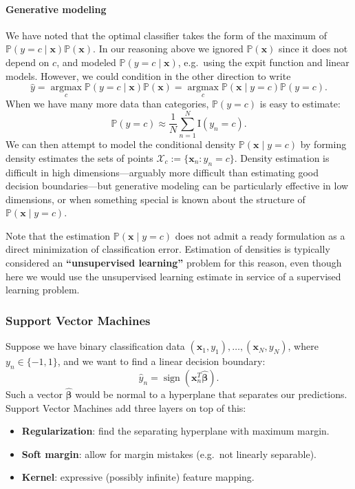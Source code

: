 \paragraph{Generative modeling}
We have noted that the optimal classifier takes the form of the maximum of $\mathbb{P}(y = c \mid \mathbf{x})\mathbb{P}(\mathbf{x})$. In our reasoning above we ignored $\mathbb{P}(\mathbf{x})$ since it does not depend on $c$, and modeled $\mathbb{P}(y = c \mid \mathbf{x})$, e.g.\ using the expit function and linear models.
However, we could condition in the other direction to write
\begin{equation*}
\hat{y} = \operatorname*{argmax}_{c} \mathbb{P}(y = c \mid \mathbf{x})\mathbb{P}(\mathbf{x}) = \operatorname*{argmax}_{c} \mathbb{P}(\mathbf{x} \mid y = c)\mathbb{P}(y = c).
\end{equation*}
When we have many more data than categories, $\mathbb{P}(y = c)$ is easy to estimate:
\begin{equation*}
\mathbb{P}(y = c) \approx \frac{1}{N} \sum_{n=1}^{N} \mathrm{I}(y_n = c).
\end{equation*}
We can then attempt to model the conditional density $\mathbb{P}(\mathbf{x} \mid y = c)$ by forming density estimates the sets of points $\mathcal{X}_c := \{\mathbf{x}_n : y_n = c\}$. Density estimation is difficult in high dimensions---arguably more difficult than estimating good decision boundaries---but generative modeling can be particularly effective in low dimensions, or when something special is known about the structure of $\mathbb{P}(\mathbf{x} \mid y = c)$.

Note that the estimation $\mathbb{P}(\mathbf{x} \mid y = c)$ does not admit a ready formulation as a direct minimization of classification error. Estimation of densities is typically considered an \textbf{``unsupervised learning''} problem for this reason, even though here we would use the unsupervised learning estimate in service of a supervised learning problem.

\subsubsection{Support Vector Machines}
Suppose we have binary classification data $(\mathbf{x}_1, y_1), \ldots, (\mathbf{x}_N, y_N)$, where $y_n \in \{-1, 1\}$, and we want to find a linear decision boundary:
\begin{equation*}
\hat{y}_n = \operatorname{sign}(\mathbf{x}_n^{T} \hat{\mathbf{\beta}}).
\end{equation*}
Such a vector $\hat{\mathbf{\beta}}$ would be normal to a hyperplane that separates our predictions.
Support Vector Machines add three layers on top of this:
\begin{itemize}
    \item \textbf{Regularization}: find the separating hyperplane with maximum margin.
    \item \textbf{Soft margin}: allow for margin mistakes (e.g.\ not linearly separable).
    \item \textbf{Kernel}: expressive (possibly infinite) feature mapping.
\end{itemize}

